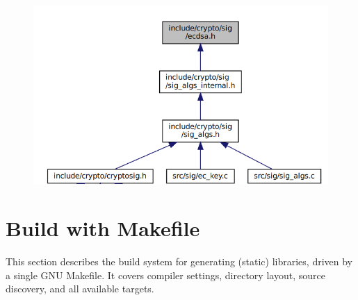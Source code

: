 \begin{figure}[h!]\centering
	\includegraphics[scale=.7]{dep-graph/ecdsa.png}
\end{figure}

\newpage
\section{Build with Makefile}
This section describes the build system for generating (static) libraries, driven by a single GNU Makefile. It covers compiler settings, directory layout, source discovery, and all available targets.


